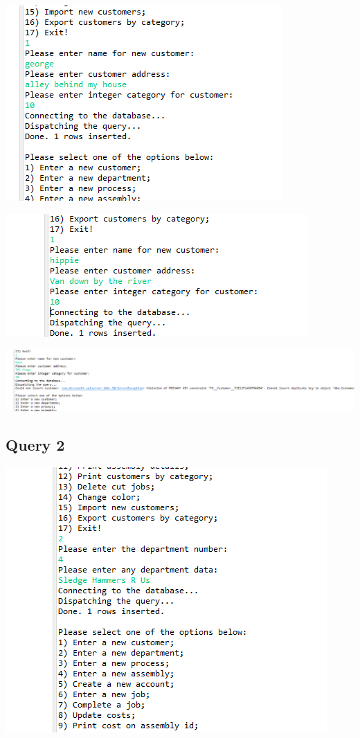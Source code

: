 \documentclass[11pt]{article}
\begin{document}
\includegraphics[width = \textwidth]{cust3.png}

\includegraphics[width = \textwidth]{cust4.png}

\includegraphics[width = \textwidth]{cust5.png}

\subsection{Query 2}
\includegraphics[width = \textwidth]{dept1.png}
\end{document}
